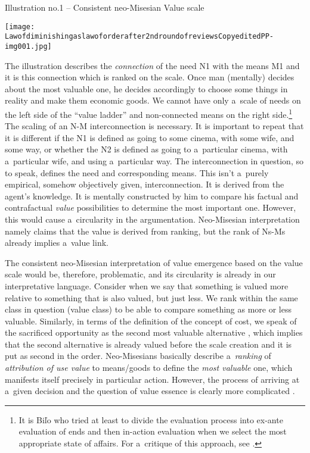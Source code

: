 Illustration no.1 -- Consistent neo-Misesian Value scale



{\centering \texttt{[image: Lawofdiminishingaslawoforderafter2ndroundofreviewsCopyeditedPP-img001.jpg]} }

The illustration describes the \textit{connection} of the need N1 with the means M1 and it is this connection which is ranked on the scale. Once man (mentally) decides about the most valuable one, he decides accordingly to choose some things in reality and make them economic goods. We cannot have only a~scale of needs on the left side of the ``value ladder'' and non-connected means on the right side.\footnote{It is Biľo 
\parencite*[][]{} %
 who tried at least to divide the evaluation process into ex-ante evaluation of ends and then in-action evaluation when we select the most appropriate state of affairs. For a~critique of this approach, see 
\parencite[][]{}.%
} The scaling of an N-M interconnection is necessary. It is important to repeat that it is different if the N1 is defined as going to some cinema, with some wife, and some way, or whether the N2 is defined as going to a~particular cinema, with a~particular wife, and using a~particular way. The interconnection in question, so to speak, defines the need and corresponding means. This isn't a~purely empirical, somehow objectively given, interconnection. It is derived from the agent's knowledge. It is mentally constructed by him to compare his factual and contrafactual \textit{value} possibilities to determine the most important one. However, this would cause a~circularity in the argumentation. Neo-Misesian interpretation namely claims that the value is derived from ranking, but the rank of Ns-Ms already implies a~value link.



The consistent neo-Misesian interpretation of value emergence based on the value scale would be, therefore, problematic, and its circularity is already in our interpretative language. Consider when we say that something is valued more relative to something that is also valued, but just less. We rank within the same class in question (value class) to be able to compare something as more or less valuable. Similarly, in terms of the definition of the concept of cost, we speak of the sacrificed opportunity as the second most valuable alternative 
\parencite[or ``the next most urgent want''][p.174]{}, %
 which implies that the second alternative is already valued before the scale creation and it is put as second in the order. Neo-Misesians basically describe a~\textit{ranking} of \textit{attribution of use value} to means/goods to define the \textit{most valuable} one, which manifests itself precisely in particular action. However, the process of arriving at a~given decision and the question of value essence is clearly more complicated 
\parencites[see also][pp.45–46]{}[][]{}.%




